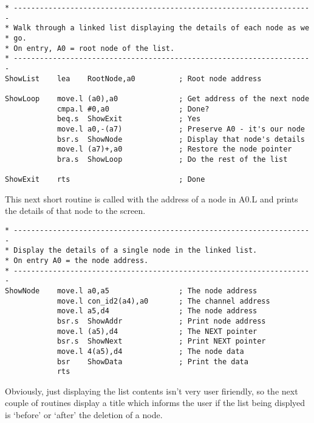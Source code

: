 \begin{lstlisting}[firstnumber=last,caption={Single Linked List - Demo Code - Show List}]
* ---------------------------------------------------------------------
* Walk through a linked list displaying the details of each node as we
* go.
* On entry, A0 = root node of the list.
* ---------------------------------------------------------------------
ShowList    lea    RootNode,a0          ; Root node address

ShowLoop    move.l (a0),a0              ; Get address of the next node
            cmpa.l #0,a0                ; Done?
            beq.s  ShowExit             ; Yes
            move.l a0,-(a7)             ; Preserve A0 - it's our node
            bsr.s  ShowNode             ; Display that node's details
            move.l (a7)+,a0             ; Restore the node pointer 
            bra.s  ShowLoop             ; Do the rest of the list

ShowExit    rts                         ; Done
\end{lstlisting}

This next short routine is called with the address of a node in A0.L
    and prints the details of that node to the screen.

\begin{lstlisting}[firstnumber=last,caption={Single Linked List - Demo Code - Show Node}]
* ---------------------------------------------------------------------
* Display the details of a single node in the linked list.
* On entry A0 = the node address.
* ---------------------------------------------------------------------
ShowNode    move.l a0,a5                ; The node address
            move.l con_id2(a4),a0       ; The channel address
            move.l a5,d4                ; The node address
            bsr.s  ShowAddr             ; Print node address
            move.l (a5),d4              ; The NEXT pointer
            bsr.s  ShowNext             ; Print NEXT pointer
            move.l 4(a5),d4             ; The node data
            bsr    ShowData             ; Print the data
            rts
\end{lstlisting}

Obviously, just displaying the list contents isn't very user
    firiendly, so the next couple of routines display a title which informs
    the user if the list being displyed is `before' or `after' the deletion
    of a node.

